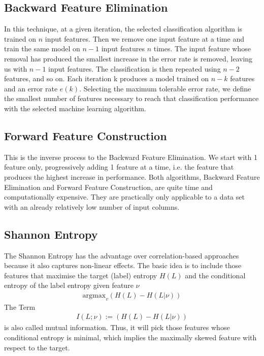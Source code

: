 \documentclass[10pt,a4paper]{article}
\begin{document}
\subsection*{Backward Feature Elimination}
In this technique, at a given iteration, the selected classification algorithm is trained on $n$ input features. Then we remove one input feature at a time and train the same model on $n-1$ input features $n$ times. The input feature whose removal has produced the smallest increase in the error rate is removed, leaving us with $n-1$ input features. The classification is then repeated using $n-2$ features, and so on. Each iteration k produces a model trained on $n-k$ features and an error rate $e(k)$. Selecting the maximum tolerable error rate, we define the smallest number of features necessary to reach that classification performance with the selected machine learning algorithm.


\subsection*{Forward Feature Construction}
This is the inverse process to the Backward Feature Elimination. We start with 1 feature only, progressively adding 1 feature at a time, i.e. the feature that produces the highest increase in performance. Both algorithms, Backward Feature Elimination and Forward Feature Construction, are quite time and computationally expensive. They are practically only applicable to a data set with an already relatively low number of input columns.

\subsection*{Shannon Entropy}
The Shannon Entropy has the advantage over correlation-based approaches because it also captures non-linear effects. The basic idea is to include those features that maximise the target (label) entropy $H(L)$ and the conditional entropy of the  label entropy given feature $\nu$
\begin{align}
\text{argmax}_v\left( H(L) - H(L|\nu)\right)
\end{align}
The Term 
\begin{align}
I(L;\nu) :=\left( H(L) - H(L|\nu)\right)
\end{align}
is also called mutual information.
Thus, it will pick those features whose conditional entropy is minimal, which implies the maximally skewed feature with respect to the target. 
\end{document}
